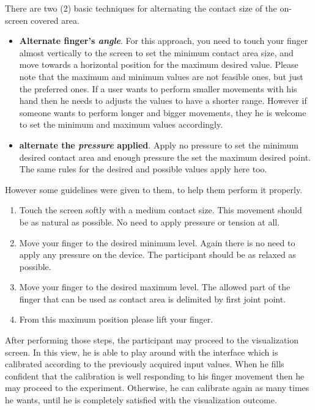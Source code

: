 There are two (2)  basic techniques for alternating the contact size of the on-screen covered area.

\begin{itemize}
	\item \textbf{Alternate finger's \textit{angle}}. For this approach, you need to touch your finger almost vertically to the screen to set the minimum contact area size, and move towards a horizontal position for the maximum desired value. Please note that the maximum and minimum values are not feasible ones, but just the preferred ones. If a user wants to perform smaller movements with his hand then he needs to adjusts the values to have a shorter range. However if someone wants to perform longer and bigger movements, they he is welcome to set the minimum and maximum values accordingly.

	\item \textbf{alternate the \textit{pressure} applied}.  Apply no pressure to set the minimum desired contact area and enough pressure the set the maximum desired point. The same rules for the desired and possible values apply here too.
\end{itemize}


However some guidelines were given to them, to help them perform it properly.
\begin{enumerate}
	\item Touch the screen softly with a medium contact size. This movement should be as natural as possible. No need to apply pressure or tension at all.
	\item Move your finger to the desired minimum level. Again there is no need to apply any pressure on the device. The participant should be as relaxed as possible.
	\item Move your finger to the desired maximum level. The allowed part of the finger that can be used as contact area is delimited by first joint point. 
	\item From this maximum position please lift your finger. 
\end{enumerate}

After performing those steps, the participant may proceed to the visualization screen. In this view, he is able to play around with the interface which is calibrated according to the previously acquired input values. When he fills confident that the calibration is well responding to his finger movement then he may proceed to the experiment. Otherwise, he can calibrate again as many times he wants, until he is completely satisfied with the visualization outcome.

